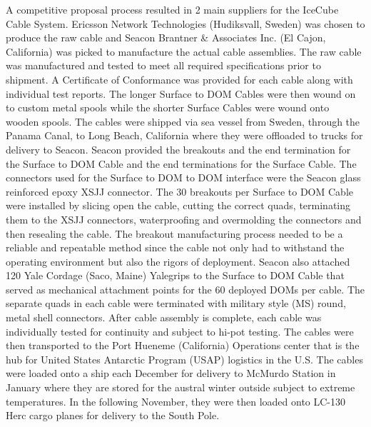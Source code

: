 A competitive proposal process resulted in 2 main suppliers for the IceCube
Cable System. Ericsson Network Technologies (Hudiksvall, Sweden) was chosen
to produce the raw cable and Seacon Brantner \& Associates Inc. (El Cajon,
California) was picked to manufacture the actual cable assemblies. The raw
cable was manufactured and tested to meet all required specifications prior
to shipment. A Certificate of Conformance was provided for each cable along
with individual test reports. The longer Surface to DOM Cables were then
wound on to custom metal spools while the shorter Surface Cables were wound
onto wooden spools. The cables were shipped via sea vessel from Sweden,
through the Panama Canal, to Long Beach, California where they were
offloaded to trucks for delivery to Seacon. Seacon provided the breakouts
and the end termination for the Surface to DOM Cable and the end
terminations for the Surface Cable. The connectors used for the Surface to
DOM to DOM interface were the Seacon glass reinforced epoxy XSJJ
connector. The 30 breakouts per Surface to DOM Cable were installed by
slicing open the cable, cutting the correct quads, terminating them to the
XSJJ connectors, waterproofing and overmolding the connectors and then
resealing the cable. The breakout manufacturing process needed to be a
reliable and repeatable method since the cable not only had to withstand
the operating environment but also the rigors of deployment. Seacon also
attached 120 Yale Cordage (Saco, Maine) Yalegrips to the Surface to DOM
Cable that served as mechanical attachment points for the 60 deployed DOMs
per cable. The separate quads in each cable were terminated with military
style (MS) round, metal shell connectors. After cable assembly is complete,
each cable was individually tested for continuity and subject to hi-pot
testing. The cables were then transported to the Port Hueneme (California)
Operations center that is the hub for United States Antarctic Program
(USAP) logistics in the U.S. The cables were loaded onto a ship each
December for delivery to McMurdo Station in January where they are stored
for the austral winter outside subject to extreme temperatures. In the
following November, they were then loaded onto LC-130 Herc cargo planes for
delivery to the South Pole.

